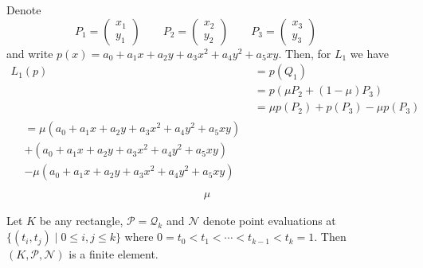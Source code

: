 \begin{example}
    Denote
    \begin{equation}
        P_1 = \begin{pmatrix}
            x_1 \\ y_1
        \end{pmatrix} \qquad
        P_2 = \begin{pmatrix}
            x_2 \\ y_2
        \end{pmatrix} \qquad
        P_3 = \begin{pmatrix}
            x_3 \\ y_3
        \end{pmatrix} \qquad
    \end{equation}
    and write \(p(x) = a_0 + a_1 x + a_2 y + a_3 x^2 + a_4 y^2 + a_5 xy\). Then, for \(L_1\) we have
    \begin{align}
        L_1 (p) &= p(Q_1) \\
        &= p(\mu P_2 + (1 - \mu)P_3) \\
        &= \mu p (P_2) + p (P_3) - \mu p (P_3) \\
        \begin{split}
            &= \mu \left( a_0 + a_1 x + a_2 y + a_3 x^2 + a_4 y^2 + a_5 xy \right) \\
            & + \left( a_0 + a_1 x + a_2 y + a_3 x^2 + a_4 y^2 + a_5 xy \right) \\
            & - \mu \left( a_0 + a_1 x + a_2 y + a_3 x^2 + a_4 y^2 + a_5 xy \right) \\
        \end{split}
    \end{align}
    \begin{align}
        \mu
    \end{align}
\end{example}

\begin{example}
    Let \(K\) be any rectangle, \(\mathcal{P} = \mathcal{Q}_k\) and \(\mathcal{N}\) denote point evaluations at \(\{(t_i, t_j) \mid 0 \leq i, j \leq k\}\) where \(0 = t_0 < t_1 < \cdots < t_{k-1} < t_k = 1\). Then \((K, \mathcal{P}, \mathcal{N})\) is a finite element.
\end{example}